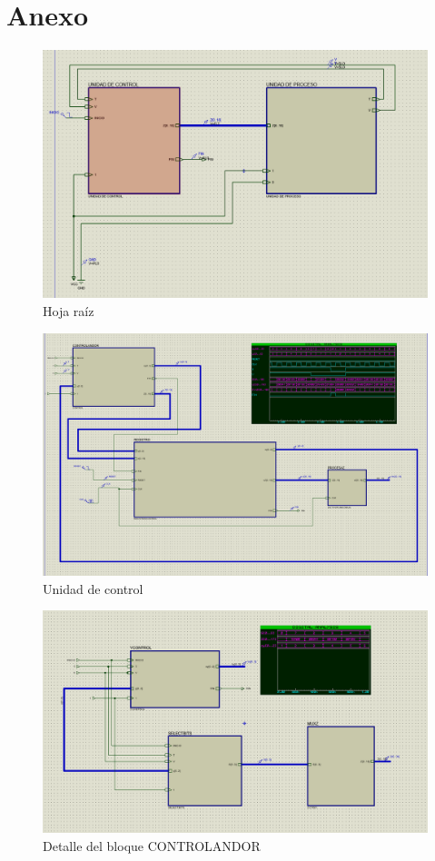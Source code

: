 \documentclass[12pt,a4paper,oneside]{article}
\begin{document}
\section{Anexo} \label{anexo}
\begin{figure}[H]
    \includegraphics[width = \textwidth]{proteus-img/raiz.PNG}
    \caption{Hoja raíz}
\end{figure}

\begin{figure}[H]
    \includegraphics[width = \textwidth]{proteus-img/ud_control.PNG}
    \caption{Unidad de control}
\end{figure}

\begin{figure}[H]
    \includegraphics[width = \textwidth]{proteus-img/controlandor.PNG}
    \caption{Detalle del bloque CONTROLANDOR}
\end{figure}
\end{document}
